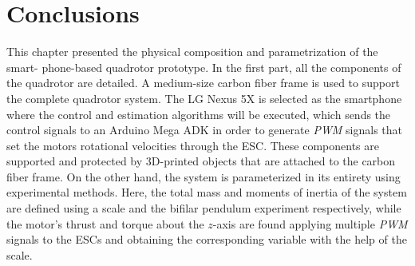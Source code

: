 \section{Conclusions}
This chapter presented the physical composition and parametrization of the smart- phone-based quadrotor prototype. In the first part, all the components of the quadrotor are detailed. A medium-size carbon fiber frame is used to support the complete quadrotor system. The LG Nexus 5X is selected as the smartphone where the control and estimation algorithms will be executed, which sends the control signals to an Arduino Mega ADK in order to generate \textit{PWM} signals that set the motors rotational velocities through the ESC. These components are supported and protected by 3D-printed objects that are attached to the carbon fiber frame. On the other hand, the system is parameterized in its entirety using experimental methods. Here, the total mass and moments of inertia of the system are defined using a scale and the bifilar pendulum experiment respectively, while the motor's thrust and torque about the $z$-axis are found applying multiple \textit{PWM} signals to the ESCs and obtaining the corresponding variable with the help of the scale.